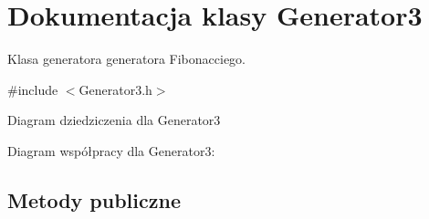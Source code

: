 \hypertarget{classGenerator3}{\section{Dokumentacja klasy Generator3}
\label{classGenerator3}
}


Klasa generatora generatora Fibonacciego.  




{\ttfamily \#include $<$Generator3.\+h$>$}



Diagram dziedziczenia dla Generator3


Diagram współpracy dla Generator3\+:
\subsection*{Metody publiczne}
